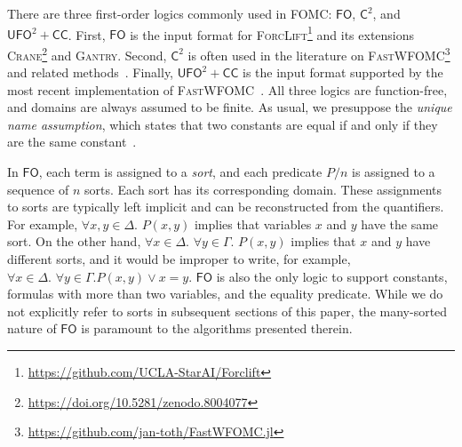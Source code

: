 \documentclass[a4paper,UKenglish,cleveref, autoref, thm-restate]{lipics-v2021}
\newcommand{\Ctwo}{$\mathsf{C}^{2}$}
\newcommand{\FO}{$\mathsf{FO}$}
\newcommand{\UFO}{$\mathsf{UFO}^{2} + \mathsf{CC}$}
\newcommand{\Cranetwo}{\textsc{Gantry}}
\begin{document}

\renewcommand*{\thefootnote}{\fnsymbol{footnote}}

There are three first-order logics commonly used in FOMC: \FO{}, \Ctwo{}, and
\UFO{}. First, \FO{} is the input format for
\textsc{ForcLift}\footnote{\url{https://github.com/UCLA-StarAI/Forclift}} and
its extensions
\textsc{Crane}\footnote{\url{https://doi.org/10.5281/zenodo.8004077}} and
\Cranetwo{}. Second, \Ctwo{} is often used in the literature on
\textsc{FastWFOMC}\footnote{\url{https://github.com/jan-toth/FastWFOMC.jl}} and
related methods~\cite{DBLP:journals/jair/Kuzelka21,DBLP:conf/aaai/MalhotraS22}.
Finally, \UFO{} is the input format supported by the most recent implementation
of \textsc{FastWFOMC}~\cite{DBLP:conf/kr/TothK24}. All three logics are
function-free, and domains are always assumed to be finite. As usual, we
presuppose the \emph{unique name assumption}, which states that two constants
are equal if and only if they are the same constant~\cite{DBLP:books/aw/RN2020}.

\renewcommand*{\thefootnote}{\arabic{footnote}}

In \FO{}, each term is assigned to a \emph{sort}, and each predicate $P/n$ is
assigned to a sequence of $n$ sorts. Each sort has its corresponding domain.
These assignments to sorts are typically left implicit and can be reconstructed
from the quantifiers. For example, $\forall x,y \in \Delta\text{. }P(x, y)$
implies that variables $x$ and $y$ have the same sort. On the other hand,
$\forall x \in \Delta\text{. }\forall y \in \Gamma\text{. } P(x, y)$ implies
that $x$ and $y$ have different sorts, and it would be improper to write, for
example, $\forall x \in \Delta\text{. }\forall y \in \Gamma\text{.
} P(x, y) \lor x = y$. \FO{} is also the only logic to support constants,
formulas with more than two variables, and the equality predicate. While we do
not explicitly refer to sorts in subsequent sections of this paper, the
many-sorted nature of \FO{} is paramount to the algorithms presented therein.
\end{document}
